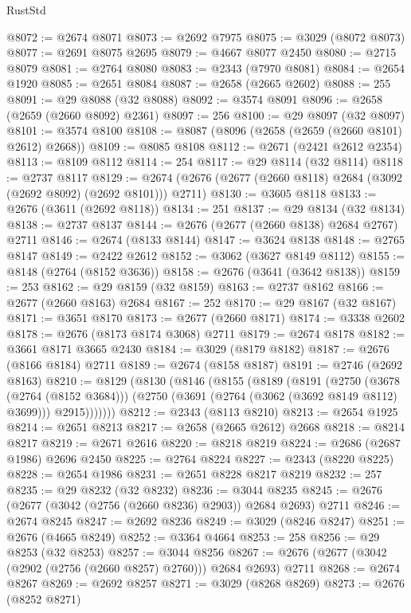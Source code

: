 \begin{lexlean}{RustStd}
\begin{coremodule}
@8072 := @2674 @8071
@8073 := @2692 @7975
@8075 := @3029 (@8072 @8073)
@8077 := @2691 @8075 @2695
@8079 := @4667 @8077 @2450
@8080 := @2715 @8079
@8081 := @2764 @8080
@8083 := @2343 (@7970 @8081)
@8084 := @2654 @1920
@8085 := @2651 @8084
@8087 := @2658 (@2665 @2602)
@8088 := 255
@8091 := @29 @8088 (@32 @8088)
@8092 := @3574 @8091
@8096 := @2658 (@2659 (@2660 @8092) @2361)
@8097 := 256
@8100 := @29 @8097 (@32 @8097)
@8101 := @3574 @8100
@8108 := @8087 (@8096 (@2658 (@2659 (@2660 @8101) @2612) @2668))
@8109 := @8085 @8108
@8112 := @2671 (@2421 @2612 @2354)
@8113 := @8109 @8112
@8114 := 254
@8117 := @29 @8114 (@32 @8114)
@8118 := @2737 @8117
@8129 := @2674 (@2676 (@2677 (@2660 @8118) @2684 (@3092 (@2692 @8092) (@2692 @8101))) @2711)
@8130 := @3605 @8118
@8133 := @2676 (@3611 (@2692 @8118))
@8134 := 251
@8137 := @29 @8134 (@32 @8134)
@8138 := @2737 @8137
@8144 := @2676 (@2677 (@2660 @8138) @2684 @2767) @2711
@8146 := @2674 (@8133 @8144)
@8147 := @3624 @8138
@8148 := @2765 @8147
@8149 := @2422 @2612
@8152 := @3062 (@3627 @8149 @8112)
@8155 := @8148 (@2764 (@8152 @3636))
@8158 := @2676 (@3641 (@3642 @8138))
@8159 := 253
@8162 := @29 @8159 (@32 @8159)
@8163 := @2737 @8162
@8166 := @2677 (@2660 @8163) @2684
@8167 := 252
@8170 := @29 @8167 (@32 @8167)
@8171 := @3651 @8170
@8173 := @2677 (@2660 @8171)
@8174 := @3338 @2602
@8178 := @2676 (@8173 @8174 @3068) @2711
@8179 := @2674 @8178
@8182 := @3661 @8171 @3665 @2430
@8184 := @3029 (@8179 @8182)
@8187 := @2676 (@8166 @8184) @2711
@8189 := @2674 (@8158 @8187)
@8191 := @2746 (@2692 @8163)
@8210 := @8129
    (@8130
      (@8146
        (@8155
          (@8189
            (@8191
              (@2750
                (@3678 (@2764 (@8152 @3684)))
                (@2750 (@3691 (@2764 (@3062 (@3692 @8149 @8112) @3699))) @2915)))))))
@8212 := @2343 (@8113 @8210)
@8213 := @2654 @1925
@8214 := @2651 @8213
@8217 := @2658 (@2665 @2612) @2668
@8218 := @8214 @8217
@8219 := @2671 @2616
@8220 := @8218 @8219
@8224 := @2686 (@2687 @1986) @2696 @2450
@8225 := @2764 @8224
@8227 := @2343 (@8220 @8225)
@8228 := @2654 @1986
@8231 := @2651 @8228 @8217 @8219
@8232 := 257
@8235 := @29 @8232 (@32 @8232)
@8236 := @3044 @8235
@8245 := @2676 (@2677 (@3042 (@2756 (@2660 @8236) @2903)) @2684 @2693) @2711
@8246 := @2674 @8245
@8247 := @2692 @8236
@8249 := @3029 (@8246 @8247)
@8251 := @2676 (@4665 @8249)
@8252 := @3364 @4664
@8253 := 258
@8256 := @29 @8253 (@32 @8253)
@8257 := @3044 @8256
@8267 := @2676 (@2677 (@3042 (@2902 (@2756 (@2660 @8257) @2760))) @2684 @2693) @2711
@8268 := @2674 @8267
@8269 := @2692 @8257
@8271 := @3029 (@8268 @8269)
@8273 := @2676 (@8252 @8271)

\end{coremodule}
\end{lexlean}
